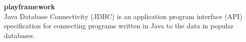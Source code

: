 
		\textbf{playframework} \\
Java Database Connectivity (JDBC) is an application program interface (API) specification for connecting programs written in Java to the data in popular databases.